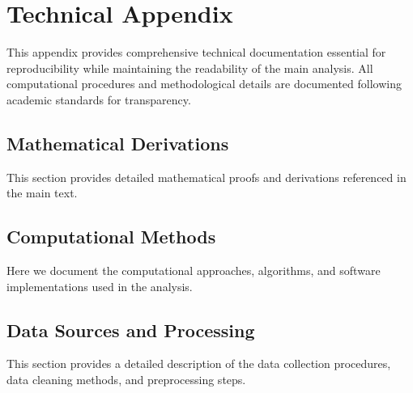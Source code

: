 %
%
%
%
%
%

\section{Technical Appendix}
\label{app:tech}

This appendix provides comprehensive technical documentation essential for reproducibility while maintaining the readability of the main analysis. All computational procedures and methodological details are documented following academic standards for transparency.

\subsection{Mathematical Derivations}
\label{app:derivations}

This section provides detailed mathematical proofs and derivations referenced in the main text.

\subsection{Computational Methods}
\label{app:computational}

Here we document the computational approaches, algorithms, and software implementations used in the analysis.

\subsection{Data Sources and Processing}
\label{app:data-processing}

This section provides a detailed description of the data collection procedures, data cleaning methods, and preprocessing steps.